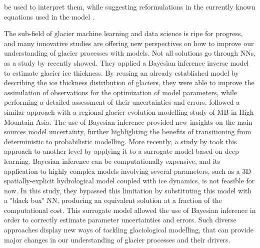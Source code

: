 be used to interpret them, while suggesting reformulations in the currently known equations used in the model \citep{rackauckas_universal_2020}. 

The sub-field of glacier machine learning and data science is ripe for progress, and many innovative studies are offering new perspectives on how to improve our understanding of glacier processes with models. Not all solutions go through NNs, as a study by \citet{werder_bayesian_2019} recently showed. They applied a Bayesian inference inverse model to estimate glacier ice thickness. By reusing an already established model by \citet{huss_distributed_2012} describing the ice thickness distribution of glaciers, they were able to improve the assimilation of observations for the optimization of model parameters, while performing a detailed assessment of their uncertainties and errors. \citet{rounce_quantifying_2020} followed a similar approach with a regional glacier evolution modelling study of MB in High Mountain Asia. The use of Bayesian inference provided new insights on the main sources model uncertainty, further highlighting the benefits of transitioning from deterministic to probabilistic modelling. More recently, a study by \citet{brinkerhoff_constraining_2020} took this approach to another level by applying it to a surrogate model based on deep learning. Bayesian inference can be computationally expensive, and its application to highly complex models involving several parameters, such as a 3D spatially-explicit hydrological model coupled with ice dynamics, is not feasible for now. In this study, they bypassed this limitation by substituting this model with a "black box" NN, producing an equivalent solution at a fraction of the computational cost. This surrogate model allowed the use of Bayesian inference in order to correctly estimate parameter uncertainties and errors. Such diverse approaches display new ways of tackling glaciological modelling, that can provide major changes in our understanding of glacier processes and their drivers. 

